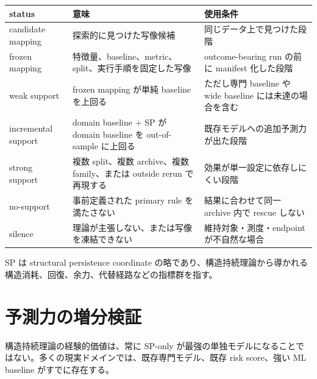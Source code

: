 \documentclass[12pt,a4paper]{article}
\begin{document}
{\def\LTcaptype{table} %
\begin{longtable}[]{@{}
  >{\raggedright\arraybackslash}p{}
  >{\raggedright\arraybackslash}p{}
  >{\raggedright\arraybackslash}p{}@{}}
\toprule\noalign{}
\begin{minipage}[b]{\linewidth}\raggedright
status
\end{minipage} & \begin{minipage}[b]{\linewidth}\raggedright
意味
\end{minipage} & \begin{minipage}[b]{\linewidth}\raggedright
使用条件
\end{minipage} \\
\midrule\noalign{}
\endhead
\bottomrule\noalign{}
\endlastfoot
candidate mapping & 探索的に見つけた写像候補 & 同じデータ上で見つけた段階 \\
frozen mapping & 特徴量、baseline、metric、split、実行手順を固定した写像 & outcome-bearing run の前に manifest 化した段階 \\
weak support & frozen mapping が単純 baseline を上回る & ただし専門 baseline や wide baseline には未達の場合を含む \\
incremental support & domain baseline + SP が domain baseline を out-of-sample に上回る & 既存モデルへの追加予測力が出た段階 \\
strong support & 複数 split、複数 archive、複数 family、または outside rerun で再現する & 効果が単一設定に依存しにくい段階 \\
no-support & 事前定義された primary rule を満たさない & 結果に合わせて同一 archive 内で rescue しない \\
silence & 理論が主張しない、または写像を凍結できない & 維持対象・測度・endpoint が不自然な場合 \\
\end{longtable}
}

SP は structural persistence coordinate の略であり、構造持続理論から導かれる構造消耗、回復、余力、代替経路などの指標群を指す。

\section{予測力の増分検証}\label{ux4e88ux6e2cux529bux306eux5897ux5206ux691cux8a3c}

構造持続理論の経験的価値は、常に SP-only が最強の単独モデルになることではない。多くの現実ドメインでは、既存専門モデル、既存 risk score、強い ML baseline がすでに存在する。
\end{document}

